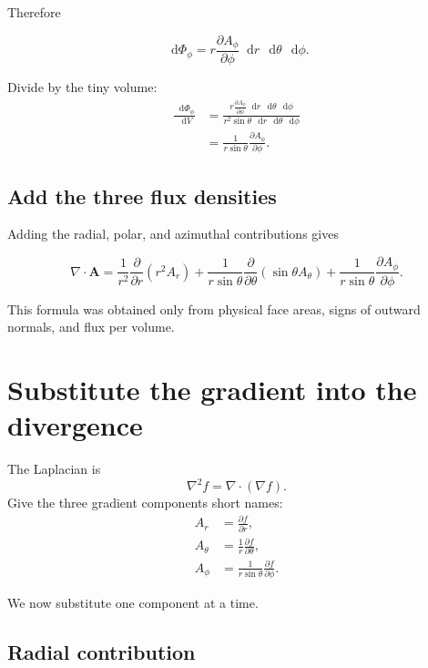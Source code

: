 \documentclass[11pt,a4paper]{article}
\newcommand{\dd}{\mathop{}\!\mathrm d}
\begin{document}
Therefore
\begin{result}
\[
  \boxed{
  \dd\Phi_\phi
  =r\frac{\partial A_\phi}{\partial\phi}
  \dd r\,\dd\theta\,\dd\phi.}
\]
\end{result}

Divide by the tiny volume:
\begin{align*}
  \frac{\dd\Phi_\phi}{\dd V}
  &=
  \frac{
  r\frac{\partial A_\phi}{\partial\phi}
  \dd r\,\dd\theta\,\dd\phi
  }{
  r^2\sin\theta\,\dd r\,\dd\theta\,\dd\phi
  }\\
  &=\boxed{
  \frac{1}{r\sin\theta}
  \frac{\partial A_\phi}{\partial\phi}}.
\end{align*}

\subsection{Add the three flux densities}

Adding the radial, polar, and azimuthal contributions gives
\begin{result}
\[
  \boxed{
  \nabla\cdot\bm A
  =\frac{1}{r^2}\frac{\partial}{\partial r}(r^2A_r)
  +\frac{1}{r\sin\theta}\frac{\partial}{\partial\theta}
   (\sin\theta A_\theta)
  +\frac{1}{r\sin\theta}\frac{\partial A_\phi}{\partial\phi}.}
\]
\end{result}

This formula was obtained only from physical face areas, signs of outward normals, and flux per volume.

\clearpage

\section{Substitute the gradient into the divergence}

The Laplacian is
\[
  \nabla^2f=\nabla\cdot(\nabla f).
\]
Give the three gradient components short names:
\begin{align*}
  A_r&=\frac{\partial f}{\partial r},\\
  A_\theta&=\frac{1}{r}\frac{\partial f}{\partial\theta},\\
  A_\phi&=\frac{1}{r\sin\theta}\frac{\partial f}{\partial\phi}.
\end{align*}

We now substitute one component at a time.

\subsection{Radial contribution}
\end{document}
